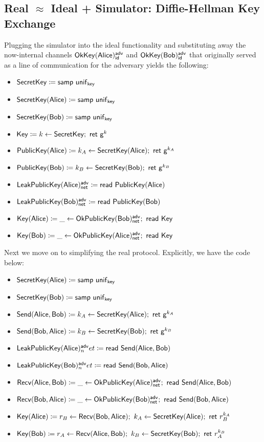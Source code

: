 \subsection{Real $\approx$ Ideal + Simulator: Diffie-Hellman Key Exchange}
Plugging the simulator into the ideal functionality and substituting away the now-internal channels $\mathsf{OkKey}(\mathsf{Alice})^{\mathsf{adv}}_{\mathsf{id}}$ and $\mathsf{OkKey}(\mathsf{Bob})^{\mathsf{adv}}_{\mathsf{id}}$ that originally served as a line of communication for the adversary yields the following:

\begin{itemize}
\item $\mathsf{SecretKey} \coloneqq \mathsf{samp} \ \mathsf{unif}_{\mathsf{key}}$
\item $\mathsf{SecretKey}(\mathsf{Alice}) \coloneqq \mathsf{samp} \ \mathsf{unif}_{\mathsf{key}}$
\item $\mathsf{SecretKey}(\mathsf{Bob}) \coloneqq \mathsf{samp} \ \mathsf{unif}_{\mathsf{key}}$
\item $\mathsf{Key} \coloneqq k \leftarrow \mathsf{SecretKey}; \ \mathsf{ret} \ \mathsf{g}^k$
\item $\mathsf{PublicKey}(\mathsf{Alice}) \coloneqq k_A \leftarrow \mathsf{SecretKey}(\mathsf{Alice}); \ \mathsf{ret} \ \mathsf{g}^{k_A}$
\item $\mathsf{PublicKey}(\mathsf{Bob}) \coloneqq k_B \leftarrow \mathsf{SecretKey}(\mathsf{Bob}); \ \mathsf{ret} \ \mathsf{g}^{k_B}$
\item $\mathsf{LeakPublicKey}(\mathsf{Alice})^{\mathsf{adv}}_{\mathsf{net}} \coloneqq \mathsf{read} \ \mathsf{PublicKey}(\mathsf{Alice})$
\item $\mathsf{LeakPublicKey}(\mathsf{Bob})^{\mathsf{adv}}_{\mathsf{net}} \coloneqq \mathsf{read} \ \mathsf{PublicKey}(\mathsf{Bob})$
\item $\mathsf{Key}(\mathsf{Alice}) \coloneqq \_ \leftarrow \mathsf{OkPublicKey}(\mathsf{Bob})^{\mathsf{adv}}_{\mathsf{net}}; \ \mathsf{read} \ \mathsf{Key}$
\item $\mathsf{Key}(\mathsf{Bob}) \coloneqq \_ \leftarrow \mathsf{OkPublicKey}(\mathsf{Alice})^{\mathsf{adv}}_{\mathsf{net}}; \ \mathsf{read} \ \mathsf{Key}$
\end{itemize}

\noindent Next we move on to simplifying the real protocol.  Explicitly, we have the code below:

\begin{itemize}
\item $\mathsf{SecretKey}(\mathsf{Alice}) \coloneqq \mathsf{samp} \ \mathsf{unif}_{\mathsf{key}}$
\item $\mathsf{SecretKey}(\mathsf{Bob}) \coloneqq \mathsf{samp} \ \mathsf{unif}_{\mathsf{key}}$
\item $\mathsf{Send}(\mathsf{Alice},\mathsf{Bob}) \coloneqq k_A \leftarrow \mathsf{SecretKey}(\mathsf{Alice}); \ \mathsf{ret} \ \mathsf{g}^{k_A}$
\item $\mathsf{Send}(\mathsf{Bob},\mathsf{Alice}) \coloneqq k_B \leftarrow \mathsf{SecretKey}(\mathsf{Bob}); \ \mathsf{ret} \ \mathsf{g}^{k_B}$
\item $\mathsf{LeakPublicKey}(\mathsf{Alice})^{\mathsf{adv}}_net \coloneqq \mathsf{read} \ \mathsf{Send}(\mathsf{Alice},\mathsf{Bob})$
\item $\mathsf{LeakPublicKey}(\mathsf{Bob})^{\mathsf{adv}}_net \coloneqq \mathsf{read} \ \mathsf{Send}(\mathsf{Bob},\mathsf{Alice})$
\item $\Recv(\Alice,\Bob) \coloneqq \_ \leftarrow \OkPublicKey(\Alice)^\adv_\net; \ \read{\Send(\Alice,\Bob)}$
\item $\Recv(\Bob,\Alice) \coloneqq \_ \leftarrow \OkPublicKey(\Bob)^\adv_\net; \ \read{\Send(\Bob,\Alice)}$
\item $\Key(\Alice) \coloneqq r_B \leftarrow \Recv(\Bob,\Alice); \ k_A \leftarrow \SecretKey(\Alice); \ \ret{r_B^{k_A}}$
\item $\Key(\Bob) \coloneqq r_A \leftarrow \Recv(\Alice,\Bob); \ k_B \leftarrow \SecretKey(\Bob); \ \ret{r_A^{k_B}}$
\end{itemize}

